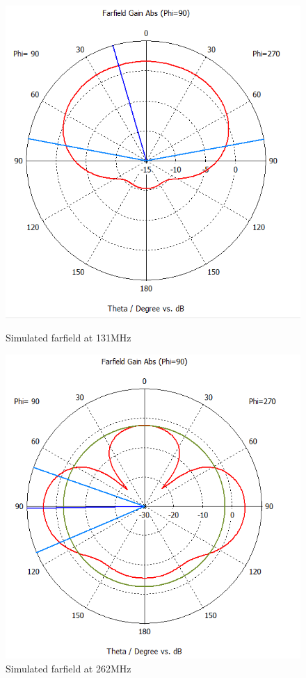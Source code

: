\begin{figure}[H]
  \centering
  \begin{minipage}[b]{0.5\textwidth}
	\includegraphics[scale = 0.5]{figures/antennas/qha/qha_6_ff_131}
	\caption{Simulated farfield at 131MHz}	
    \label{fig:WB_QHA}
  \end{minipage}
  \hfill
  \begin{minipage}[b]{0.4\textwidth}
	\includegraphics[scale = 0.5]{figures/antennas/qha/qha_6_ff_262}
	\caption{Simulated farfield at 262MHz}
    \label{fig:WB_QHA_feed}
  \end{minipage}
\end{figure}


